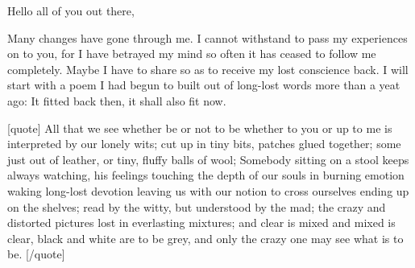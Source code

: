 Hello all of you out there, 

Many changes have gone through me. I cannot withstand to pass my experiences on to you, for I have betrayed my mind so often it has ceased to follow me completely. Maybe I have to share so as to receive my lost conscience back. 
I will start with a poem I had begun to built out of long-lost words more than a yeat ago: It fitted back then, it shall also fit now. 

[quote]
All that we see 
whether be or not to be 
whether to you or up to me 
is interpreted by our lonely wits; 
cut up in tiny bits, 
patches glued together; 
some just out of leather, 
or tiny, fluffy balls of wool; 
Somebody sitting on a stool 
keeps always watching, 
his feelings touching
the depth of our souls 
in burning emotion 
waking long-lost devotion 
leaving us with our notion 
to cross ourselves 
ending up on the shelves; 
read by the witty, 
but understood by the mad; 
the crazy and distorted pictures 
lost in everlasting mixtures; 
and clear is mixed and mixed is clear, 
black and white are to be grey, 
and only the crazy one may see 
what is to be. 
[/quote]

